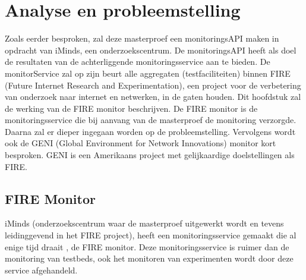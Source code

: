 \newpage
\chapter{Analyse en probleemstelling}
{\samenvatting
Zoals eerder besproken, zal deze masterproef een monitoringsAPI maken in opdracht van iMinds, een onderzoekscentrum. De monitoringsAPI heeft als doel de resultaten van de achterliggende monitoringsservice aan te bieden. De monitorService zal op zijn beurt alle aggregaten (testfaciliteiten) binnen FIRE (Future Internet Research and Experimentation), een project voor de verbetering van onderzoek naar internet en netwerken, in de gaten houden. Dit hoofdstuk zal de werking van de FIRE monitor beschrijven. De FIRE monitor is de monitoringsservice die bij aanvang van de masterproef de monitoring verzorgde. Daarna zal er dieper ingegaan worden op de probleemstelling. Vervolgens wordt ook de GENI (Global Environment for Network Innovations) monitor kort besproken. GENI is een Amerikaans project met gelijkaardige doelstellingen als FIRE.}
\section{FIRE Monitor}
\npar
iMinds (onderzoekscentrum waar de masterproef uitgewerkt wordt en tevens leidinggevend in het FIRE project), heeft een monitoringsservice gemaakt die al enige tijd draait \citep{fed4fire-second-fed-arch}, de FIRE monitor. Deze monitoringsservice is ruimer dan de monitoring van testbeds, ook het monitoren van experimenten wordt door deze service afgehandeld\citep{fed4fire-second-fed-arch}. 
